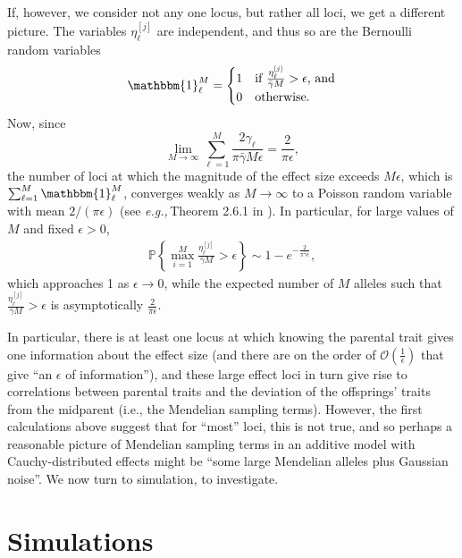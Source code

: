 \documentclass{article}
\renewcommand{\P}{\mathbb{P}}
\newcommand{\eg}{\textit{e.g.,}\,}
\newcommand{\1}{\mathbbm{1}}
\newcommand{\Oh}{{\mathcal O}}
\theoremstyle{remark}
\theoremstyle{definition}
\begin{document}
If, however, we consider not any one locus, but rather all loci, we get a different picture. 
The variables $\eta^{[j]}_{\ell}$ are independent, and thus so are the Bernoulli random variables 
\begin{equation}
	\1^{M}_{\ell} = \begin{cases}
        1 & \text{if $\frac{\eta^{[j]}_{\ell}}{\bar{\gamma} M} > \epsilon$, and}\\
		0 & \text{otherwise.}
	\end{cases}
\end{equation}
Now, since
\[
	\lim_{M \to \infty} \sum_{\ell = 1}^{M} \frac{2\gamma_{\ell}}{\pi \bar{\gamma} M \epsilon} = \frac{2}{\pi \epsilon},
\]
the number of loci at which the magnitude of the effect size exceeds $M \epsilon$, which is 
$\sum_{\ell = 1}^{M} \1^{M}_{\ell}$,
converges weakly as $M \to \infty$ to a Poisson random variable with mean $2/(\pi \epsilon)$ (see \eg Theorem 2.6.1 in \cite{Durrett2005}).  In particular, for large values of $M$ and fixed $\epsilon > 0$,
\begin{align*}
    \P\left\{\max_{i=1}^{M} \frac{\eta^{[j]}_{\ell}}{\bar{\gamma} M} > \epsilon\right\}  \sim 1-e^{-\frac{2}{\pi \bar{\gamma} \epsilon}},
\end{align*}
which approaches 1 as $\epsilon \to 0$, while the expected number of $M$ alleles such that $\frac{\eta^{[j]}_{\ell}}{\bar{\gamma} M} > \epsilon$ is asymptotically $\frac{2}{\pi\epsilon}$. 

In particular, there is at least one locus at which knowing the parental trait gives one information about the effect size (and there are on the order of $\Oh\left(\frac{1}{\epsilon}\right)$ that give ``an $\epsilon$ of information''), and these large effect loci in turn give rise to correlations between
parental traits and the deviation of the offsprings' traits from the midparent
(i.e., the Mendelian sampling terms).
However, the first calculations above
suggest that for ``most'' loci,
this is not true,
and so perhaps a reasonable picture of Mendelian sampling terms
in an additive model with Cauchy-distributed effects
might be ``some large Mendelian alleles plus Gaussian noise''.
We now turn to simulation,
to investigate.

\section{Simulations}
\end{document}
